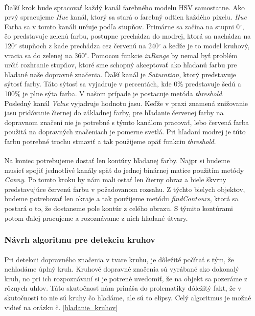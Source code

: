 \documentclass[12pt]{article}
\begin{document}
\paragraph{}
Ďalší krok bude spracovať každý kanál farebného modelu HSV samostatne. Ako prvý spracujeme \emph{Hue} kanál, ktorý sa stará o farebný odtien každého pixelu.
\emph{Hue} Farba sa v tomto kanáli určuje podľa stupňov. 
Primárne sa začína na stupni 0$^\circ$, čo predstavuje zelenú farbu, postupne prechádza do modrej,
ktorá sa nachádza na 120$^\circ$ stupňoch z kade prechádza cez červenú na 240$^\circ$ a keďže je to model kruhový, vracia sa do zelenej na 360$^\circ$.
Pomocou funkcie \emph{inRange} by nemal byť problém určiť rozhranie stupňov, ktoré sme schopný akceptovať ako hľadanú farbu pre hľadané naše dopravné značenia.
Ďalší kanál je \emph{Saturation}, ktorý predstavuje sýtosť farby. Táto sýtosť sa vyjadruje v percentách, kde 0\% predstavuje šedú a 100\% je plne sýta farba.\cite{hsv_wiki_cz} 
V našom prípade je postacuje metóda \emph{threshold}. Posledný kanál \emph{Value} vyjadruje hodnotu jasu.
Keďže v praxi znamená znižovanie jasu pridávanie čiernej do základnej farby,
pre hľadanie červenej farby na dopravnom značení nie je potrebné s týmto kanálom pracovať, lebo červená farba použitá na dopravných značeniach je pomerne svetlá.
Pri hľadaní modrej je túto farbu potrebné trochu stmaviť a tak použijeme opäť funkciu \emph{threshold}.
\paragraph{}
Na koniec potrebujeme dostať len kontúry hľadanej farby. 
Najpr si budeme musieť spojiť jednotlivé kanály späť do jednej binárnej matice použitím metódy \emph{Canny}. 
Po tomto kroku by nám mali ostať len čierny obraz a biele škvrny predstavujúce červenú farbu v požadovanom rozsahu.
Z týchto bielych objektov, budeme potrebovať len okraje a tak použijeme metódu \emph{findContours}, ktorá sa postará o to, že dostaneme pole kontúr z celého obrazu.
S týmito kontúrami potom ďalej pracujeme a rozoznávame z nich hľadané útvary.
\subsubsection{Návrh algoritmu pre detekciu kruhov}
\paragraph{}
Pri detekcii dopravného značenia v tvare kruhu, je dôležité počítať s tým, že nehľadáme úplný kruh. Kruhové dopravné značenia sú vyrábané ako dokonalý kruh,
no pri ich rozpoznávaní si je potrené uvedomiť, že na objekt sa pozeráme z rôznych uhlov. Táto skutočnosť nám prináša do prolematiky dôležitý fakt,
že v skutočnosti to nie sú kruhy čo hľadáme, ale sú to elipsy. Celý algoritmus je možné vidieť na orázku č. \ref{hladanie_kruhov}
\end{document}
